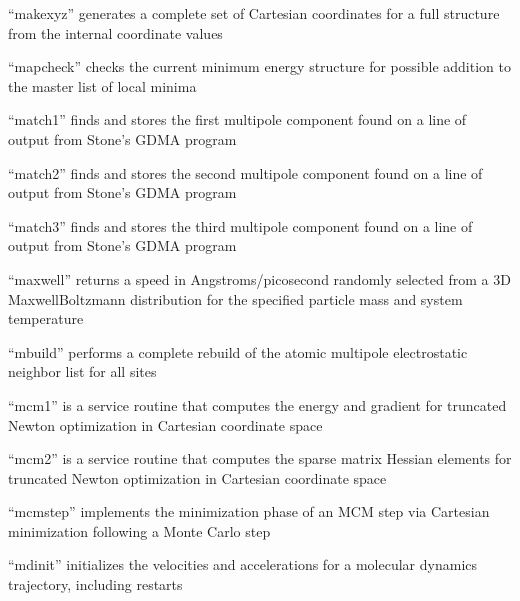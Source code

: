 \documentclass[letterpaper,11pt,english]{sphinxmanual}
\begin{document}

“makexyz” generates a complete set of Cartesian coordinates
for a full structure from the internal coordinate values


“mapcheck” checks the current minimum energy structure
for possible addition to the master list of local minima


“match1” finds and stores the first multipole component found
on a line of output from Stone’s GDMA program


“match2” finds and stores the second multipole component found
on a line of output from Stone’s GDMA program


“match3” finds and stores the third multipole component found
on a line of output from Stone’s GDMA program


“maxwell” returns a speed in Angstroms/picosecond randomly
selected from a 3\sphinxhyphen{}D Maxwell\sphinxhyphen{}Boltzmann distribution for the
specified particle mass and system temperature


“mbuild” performs a complete rebuild of the atomic multipole
electrostatic neighbor list for all sites


“mcm1” is a service routine that computes the energy and
gradient for truncated Newton optimization in Cartesian
coordinate space


“mcm2” is a service routine that computes the sparse matrix
Hessian elements for truncated Newton optimization in Cartesian
coordinate space


“mcmstep” implements the minimization phase of an MCM step
via Cartesian minimization following a Monte Carlo step


“mdinit” initializes the velocities and accelerations
for a molecular dynamics trajectory, including restarts
\end{document}
